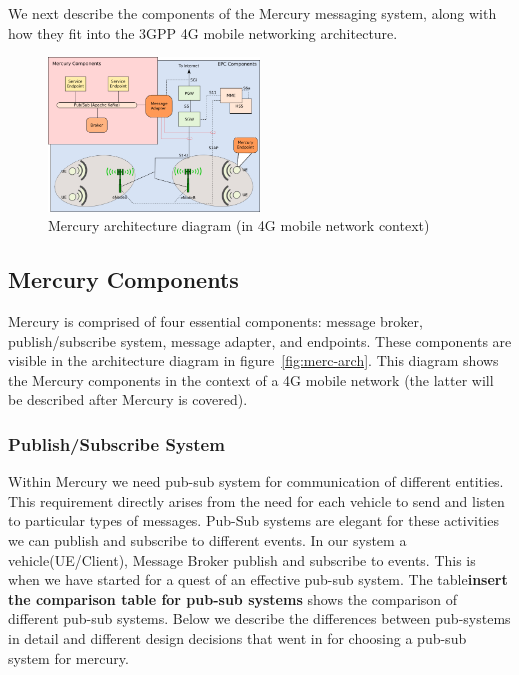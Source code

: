 We next describe the components of the Mercury messaging system, along
with how they fit into the 3GPP 4G mobile networking architecture.

\begin{figure}[h]
  \begin{center}
    \includegraphics[width=0.5\textwidth]{figs/mercury-arch.png}
    \caption{Mercury architecture diagram (in 4G mobile network context)}
    \label{fig:arch}
  \end{center}
\end{figure}

\subsection{Mercury Components}

Mercury is comprised of four essential components: message broker,
publish/subscribe system, message adapter, and endpoints.  These
components are visible in the architecture diagram in
figure~\ref{fig:merc-arch}. This diagram shows the Mercury components
in the context of a 4G mobile network (the latter will be described
after Mercury is covered).


\subsubsection{Publish/Subscribe System}

Within Mercury we need pub-sub system for communication of different entities. 
This requirement directly arises from the need for each vehicle to send and 
listen to particular types of messages. Pub-Sub systems are elegant for these 
activities we can publish and subscribe to different events. In our system a 
vehicle(UE/Client), Message Broker publish and subscribe to events. This is when
we have started for a quest of an effective pub-sub system. The table{\bf insert
the comparison table for pub-sub systems} shows the comparison of different 
pub-sub systems. Below we describe the differences between pub-systems in detail
and different design decisions that went in for choosing a pub-sub system for
mercury.
 
